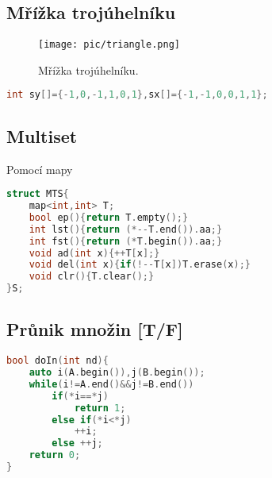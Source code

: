 \documentclass[11pt]{article}
\begin{document}
\subsection{Mřížka trojúhelníku}
\begin{figure}[H]
  \centering
  \texttt{[image: pic/triangle.png]}
  \caption[Mřížka trojúhelníku.]{Mřížka trojúhelníku.}
\end{figure}
\begin{lstlisting}[language=C++]
int sy[]={-1,0,-1,1,0,1},sx[]={-1,-1,0,0,1,1};
\end{lstlisting}
\subsection{Multiset}
Pomocí mapy
\begin{lstlisting}[language=C++]
struct MTS{
    map<int,int> T;
    bool ep(){return T.empty();}
    int lst(){return (*--T.end()).aa;}
    int fst(){return (*T.begin()).aa;}
    void ad(int x){++T[x];}
    void del(int x){if(!--T[x])T.erase(x);}
    void clr(){T.clear();}
}S;
\end{lstlisting}
\subsection{Průnik množin [T/F]}
\begin{lstlisting}[language=C++]
bool doIn(int nd){
    auto i(A.begin()),j(B.begin());
    while(i!=A.end()&&j!=B.end())
        if(*i==*j)
            return 1;
        else if(*i<*j)
            ++i;
        else ++j;
    return 0;
}
\end{lstlisting}
\end{document}
